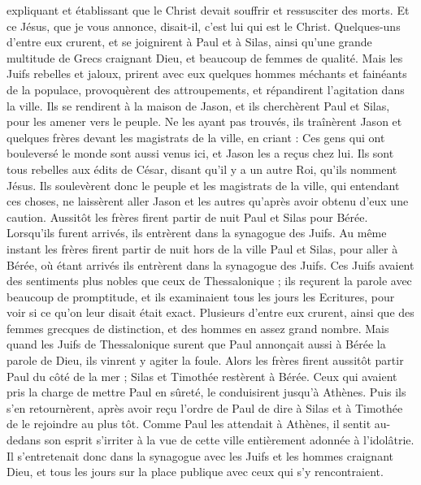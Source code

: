 \begin{multicols}{2}
expliquant et établissant que le Christ devait souffrir et ressusciter des morts. Et ce Jésus, que je vous annonce, disait-il, c’est lui qui est le Christ.
Quelques-uns d'entre eux crurent, et se joignirent à Paul et à Silas, ainsi qu’une grande multitude de Grecs craignant Dieu, et beaucoup de femmes de qualité.
Mais les Juifs rebelles et jaloux, prirent avec eux quelques hommes méchants et fainéants de la populace, provoquèrent des attroupements, et répandirent l’agitation dans la ville. Ils se rendirent à la maison de Jason, et ils cherchèrent Paul et Silas, pour les amener vers le peuple.
Ne les ayant pas trouvés, ils traînèrent Jason et quelques frères devant les magistrats de la ville, en criant : Ces gens qui ont bouleversé le monde sont aussi venus ici, et Jason les a reçus chez lui.
Ils sont tous rebelles aux édits de César, disant qu'il y a un autre Roi, qu'ils nomment Jésus.
Ils soulevèrent donc le peuple et les magistrats de la ville, qui entendant ces choses,
ne laissèrent aller Jason et les autres qu’après avoir obtenu d’eux une caution. Aussitôt les frères firent partir de nuit Paul et Silas pour Bérée. Lorsqu’ils furent arrivés, ils entrèrent dans la synagogue des Juifs.
Au même instant les frères firent partir de nuit hors de la ville Paul et Silas, pour aller à Bérée, où étant arrivés ils entrèrent dans la synagogue des Juifs.
Ces Juifs avaient des sentiments plus nobles que ceux de Thessalonique ; ils reçurent la parole avec beaucoup de promptitude, et ils examinaient tous les jours les Ecritures, pour voir si ce qu’on leur disait était exact.
Plusieurs d'entre eux crurent, ainsi que des femmes grecques de distinction, et des hommes en assez grand nombre.
Mais quand les Juifs de Thessalonique surent que Paul annonçait aussi à Bérée la parole de Dieu, ils vinrent y agiter la foule.
Alors les frères firent aussitôt partir Paul du côté de la mer ; Silas et Timothée restèrent à Bérée.
Ceux qui avaient pris la charge de mettre Paul en sûreté, le conduisirent jusqu'à Athènes. Puis ils s’en retournèrent, après avoir reçu l’ordre de Paul de dire à Silas et à Timothée de le rejoindre au plus tôt.
Comme Paul les attendait à Athènes, il sentit au-dedans son esprit s’irriter à la vue de cette ville entièrement adonnée à l'idolâtrie.
Il s’entretenait donc dans la synagogue avec les Juifs et les hommes craignant Dieu, et tous les jours sur la place publique avec ceux qui s'y rencontraient.

\end{multicols}
